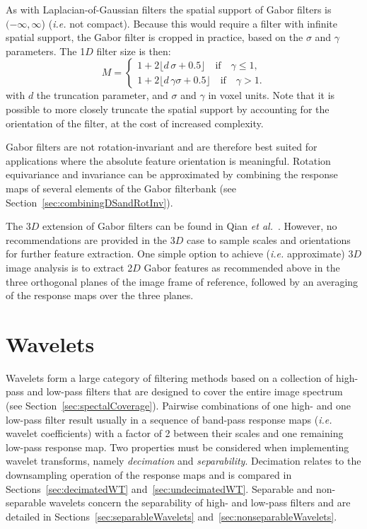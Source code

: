 \documentclass[fleqn,a4paper,oneside,openany]{book}
\begin{document}
As with Laplacian-of-Gaussian filters the spatial support of Gabor filters is \((-\infty, \infty\)) (\emph{i.e.} not compact). 
Because this would require a filter with infinite spatial support, the Gabor filter is cropped in practice, based on the $\sigma$ and $\gamma$ parameters. The 1$D$ filter size is then:
%
\begin{equation}\label{eq:gaborFilterSupport}
M= 
\begin{cases}
1 + 2\lfloor d\, \sigma + 0.5\rfloor \quad\text{if} \quad \gamma \leq 1,\\
1 + 2\lfloor d\, \gamma \sigma + 0.5\rfloor \quad\text{if} \quad \gamma > 1.
\end{cases}
\end{equation}
%
with \(d\) the truncation parameter, and \(\sigma\) and \(\gamma\) in voxel units. Note that it is possible to more closely truncate the spatial support by accounting for the orientation of the filter, at the cost of increased complexity.

Gabor filters are not rotation-invariant and are therefore best suited for applications where the absolute feature orientation is meaningful.
Rotation equivariance and invariance can be approximated by combining the response maps of several elements of the Gabor filterbank (see Section~\ref{sec:combiningDSandRotInv}).

The 3$D$ extension of Gabor filters can be found in Qian \textit{et al.}~\cite{Qian2006}. However, no recommendations are provided in the 3$D$ case to sample scales and orientations for further feature extraction.
One simple option to achieve (\textit{i.e.} approximate) 3$D$ image analysis is to extract 2$D$ Gabor features as recommended above in the three orthogonal planes  of the image frame of reference, followed by an averaging of the response maps over the three planes.
%
\section{Wavelets}\label{sec:wavelets}
%
Wavelets form a large category of filtering methods based on a collection of high-pass and low-pass filters that are designed to cover the entire image spectrum~\cite{Mallat1989} (see Section~\ref{sec:spectalCoverage}).
Pairwise combinations of one high- and one low-pass filter result usually in a sequence of band-pass response maps (\textit{i.e.} wavelet coefficients) with a factor of 2 between their scales and one remaining low-pass response map.
Two properties must be considered when implementing wavelet transforms, namely \emph{decimation} and \emph{separability}.
Decimation relates to the downsampling operation of the response maps and is compared in Sections~\ref{sec:decimatedWT} and~\ref{sec:undecimatedWT}.
Separable and non-separable wavelets concern the separability of high- and low-pass filters and are detailed in Sections~\ref{sec:separableWavelets} and~\ref{sec:nonseparableWavelets}.
%
\end{document}

